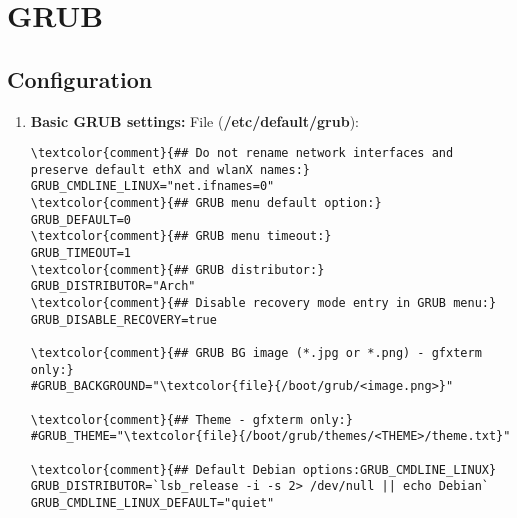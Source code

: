 \documentclass[10pt, a4paper, onecolumn, openany]{book} %
\begin{document}
\chapter{GRUB}
\section{Configuration}
\begin{enumerate}
    \item \textbf{Basic GRUB settings:}
\newline File (\textbf{\textcolor{file}{/etc/default/grub}}):
\begin{Verbatim}[commandchars=\\\{\}]
\textcolor{comment}{## Do not rename network interfaces and preserve default ethX and wlanX names:}
GRUB_CMDLINE_LINUX="net.ifnames=0"
\textcolor{comment}{## GRUB menu default option:}
GRUB_DEFAULT=0
\textcolor{comment}{## GRUB menu timeout:}
GRUB_TIMEOUT=1
\textcolor{comment}{## GRUB distributor:}
GRUB_DISTRIBUTOR="Arch"
\textcolor{comment}{## Disable recovery mode entry in GRUB menu:}
GRUB_DISABLE_RECOVERY=true

\textcolor{comment}{## GRUB BG image (*.jpg or *.png) - gfxterm only:}
#GRUB_BACKGROUND="\textcolor{file}{/boot/grub/<image.png>}"

\textcolor{comment}{## Theme - gfxterm only:}
#GRUB_THEME="\textcolor{file}{/boot/grub/themes/<THEME>/theme.txt}"

\textcolor{comment}{## Default Debian options:GRUB_CMDLINE_LINUX}
GRUB_DISTRIBUTOR=`lsb_release -i -s 2> /dev/null || echo Debian`
GRUB_CMDLINE_LINUX_DEFAULT="quiet"
\end{Verbatim}
\end{enumerate}
\end{document}
